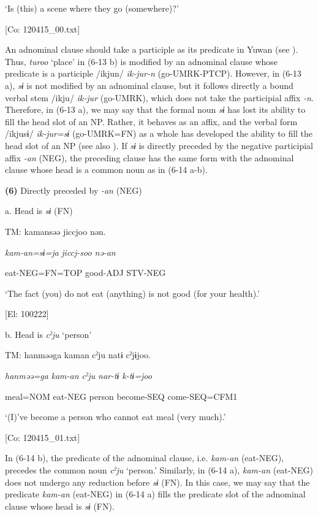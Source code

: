     ‘Is (this) a scene where they go (somewhere)?’

    [Co: 120415\_00.txt]

An adnominal clause should take a participle as its predicate in Yuwan (see ). Thus, \textit{turoo} ‘place’ in (6-13 b) is modified by an adnominal clause whose predicate is a participle /ikjun/ \textit{ik-jur-n} (go-UMRK-PTCP). However, in (6-13 a), \textit{sɨ} is not modified by an adnominal clause, but it follows directly a bound verbal stem /ikju/ \textit{ik-jur} (go-UMRK), which does not take the participial affix \textit{{}-n}. Therefore, in (6-13 a), we may say that the formal noun \textit{sɨ} has lost its ability to fill the head slot of an NP. Rather, it behaves as an affix, and the verbal form /ikjusɨ/ \textit{ik-jur=sɨ} (go-UMRK=FN) as a whole has developed the ability to fill the head slot of an NP (see also ). If \textit{sɨ} is directly preceded by the negative participial affix \textit{{}-an} (NEG), the preceding clause has the same form with the adnominal clause whose head is a common noun as in (6-14 a-b).

\textbf{(6)}  Directly preceded by \textit{{}-an} (NEG)

  a.  Head is \textit{sɨ} (FN)

    TM:  kamansəə  jiccjoo  nən.

      \textit{kam-an=sɨ=ja}  \textit{jiccj-soo}  \textit{nə-an}

      eat-NEG=FN=TOP  good-ADJ  STV-NEG

      ‘The fact (you) do not eat (anything) is not good (for your health).’

      [El: 100222]

  b.  Head is \textit{cˀju} ‘person’

    TM:  hanməəga  kaman  cˀju  natɨ  cˀjɨjoo.

      \textit{hanməə=ga}  \textit{kam-an}  \textit{cˀju}  \textit{nar-tɨ}  \textit{k-tɨ=joo}

      meal=NOM  eat-NEG  person  become-SEQ  come-SEQ=CFM1

      ‘(I)’ve become a person who cannot eat meal (very much).’

      [Co: 120415\_01.txt]

In (6-14 b), the predicate of the adnominal clause, i.e. \textit{kam-an} (eat-NEG), precedes the common noun \textit{cˀju} ‘person.’ Similarly, in (6-14 a), \textit{kam-an} (eat-NEG) does not undergo any reduction before \textit{sɨ} (FN). In this case, we may say that the predicate \textit{kam-an} (eat-NEG) in (6-14 a) fills the predicate slot of the adnominal clause whose head is \textit{sɨ} (FN).

